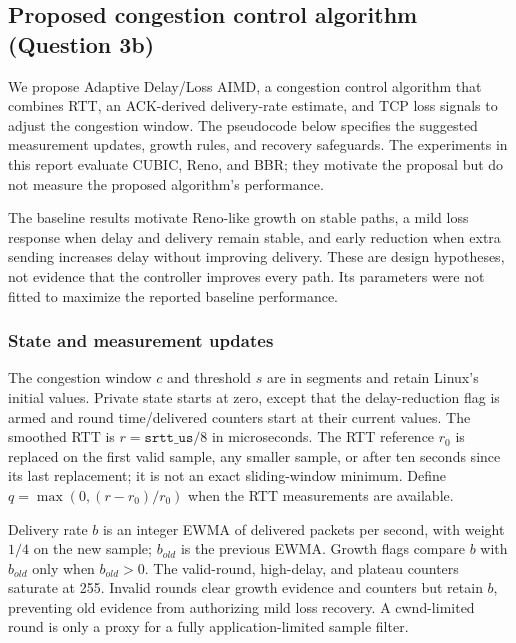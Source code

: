 \documentclass[11pt,letterpaper]{article}
\begin{document}
\clearpage

\subsection{Proposed congestion control algorithm (Question 3b)}

We propose Adaptive Delay/Loss AIMD, a congestion control algorithm that
combines RTT, an ACK-derived delivery-rate estimate, and TCP loss signals to
adjust the congestion window. The pseudocode below specifies the suggested
measurement updates, growth rules, and recovery safeguards. The experiments
in this report evaluate CUBIC, Reno, and BBR; they motivate the proposal but
do not measure the proposed algorithm's performance.

The baseline results motivate Reno-like growth on stable paths, a mild loss
response when delay and delivery remain stable, and early reduction when extra
sending increases delay without improving delivery. These are design hypotheses,
not evidence that the controller improves every path. Its parameters were not
fitted to maximize the reported baseline performance.

\subsubsection{State and measurement updates}
The congestion window $c$ and threshold $s$ are in segments and retain Linux's
initial values. Private state starts at zero, except that the delay-reduction
flag is armed and round time/delivered counters start at their current values.
The smoothed RTT is $r=\texttt{srtt\_us}/8$ in microseconds. The RTT reference
$r_0$ is replaced on the first valid sample, any smaller sample, or after ten
seconds since its last replacement; it is not an exact sliding-window minimum.
Define $q=\max(0,(r-r_0)/r_0)$ when the RTT measurements are available.

Delivery rate $b$ is an integer EWMA of delivered packets per second, with
weight $1/4$ on the new sample; $b_{old}$ is the previous EWMA. Growth flags
compare $b$ with $b_{old}$ only when $b_{old}>0$. The valid-round, high-delay,
and plateau counters saturate at 255. Invalid rounds clear growth evidence
and counters but retain $b$, preventing old evidence from authorizing mild loss
recovery. A cwnd-limited round is only a proxy for a fully application-limited
sample filter.
\end{document}
